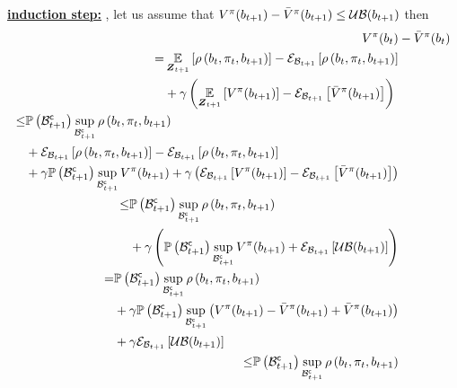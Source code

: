 \begin{proofE}
	\textbf{\underline{induction step:}}
	, let us assume that $V^\pi(b_{t+1})-\bar{V}^\pi(b_{t+1})\leq\operatorname*{\mathcal{UB}}(b_{t+1})$ then
	\begin{align*}
		V^\pi(\blf{t})&-\bar{V}^\pi(\blf{t})\\
		\begin{split}
			=&\expectation{\reward{\blf{t},\pi_t,\blf{t+1}}}{\observationsRV{t+1}}-\partialexpectation{\reward{\blf{t},\pi_t,\blf{t+1}}}{\subSpaceI{t+1}}\\
			&+\gamma\left(\expectation{V^\pi(\blf{t+1})}{\observationsRV{t+1}}-\partialexpectation{\bar{V}^\pi(\blf{t+1})}{\subSpaceI{t+1}}\right)
		\end{split}\\
		\begin{split}
			\leq&\measure{\stcompI{\subSpace}{t+1}}\sup_{\stcompI{\subSpace}{t+1}}\reward{\blf{t},\pi_t,\blf{t+1}}\\
			&+\partialexpectation{\reward{\blf{t},\pi_t,\blf{t+1}}}{\subSpaceI{t+1}}-\partialexpectation{\reward{\blf{t},\pi_t,\blf{t+1}}}{\subSpaceI{t+1}}\\
			&+\gamma\measure{\stcompI{\subSpace}{t+1}}\sup_{\stcompI{\subSpace}{t+1}}V^\pi(\blf{t+1})+\gamma\left(\partialexpectation{V^\pi(\blf{t+1})}{\subSpaceI{t+1}}-\partialexpectation{\bar{V}^\pi(\blf{t+1})}{\subSpaceI{t+1}}\right)
		\end{split}\\
		\begin{split}
			\leq&\measure{\stcompI{\subSpace}{t+1}}\sup_{\stcompI{\subSpace}{t+1}}\reward{\blf{t},\pi_t,\blf{t+1}}\\
			&+\gamma\left(\measure{\stcompI{\subSpace}{t+1}}\sup_{\stcompI{\subSpace}{t+1}}V^\pi(\blf{t+1})+\partialexpectation{\upperbound(\blf{t+1})}{\subSpaceI{t+1}}\right)
		\end{split}\\
		\begin{split}
			=&\measure{\stcompI{\subSpace}{t+1}}\sup_{\stcompI{\subSpace}{t+1}}\reward{\blf{t},\pi_t,\blf{t+1}}\\
			&+\gamma\measure{\stcompI{\subSpace}{t+1}}\sup_{\stcompI{\subSpace}{t+1}}\left(V^\pi(\blf{t+1})-\bar{V}^\pi(\blf{t+1})+\bar{V}^\pi(\blf{t+1})\right) \\
			&+\gamma\partialexpectation{\upperbound(\blf{t+1})}{\subSpaceI{t+1}}
		\end{split}\\
		\begin{split}
			\leq&\measure{\stcompI{\subSpace}{t+1}}\sup_{\stcompI{\subSpace}{t+1}}\reward{\blf{t},\pi_t,\blf{t+1}}\\

\end{split}
\end{align*}
\end{proofE}
